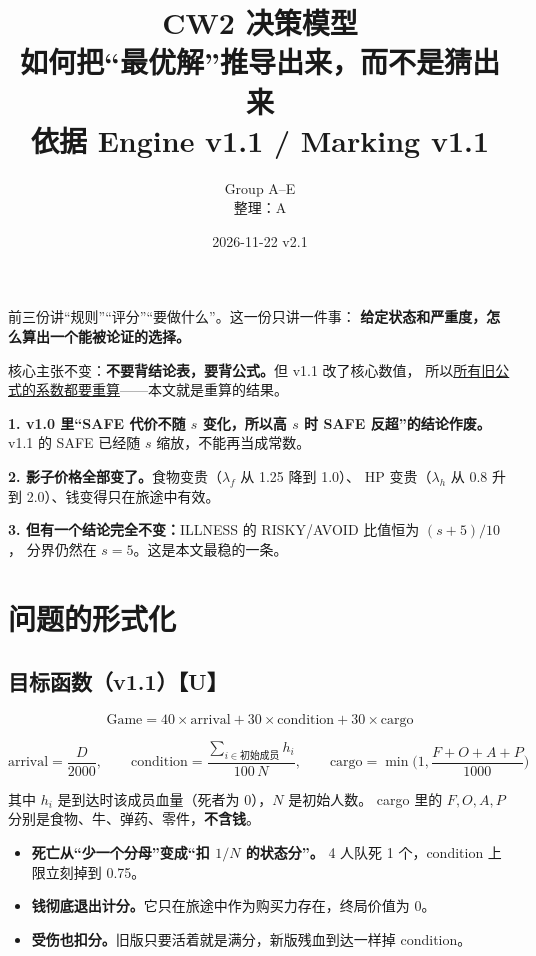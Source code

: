 \documentclass[UTF8,11pt,a4paper]{ctexart}
\title{\vspace{-1.2cm}\textbf{CW2 决策模型}\\[4pt]
\large 如何把“最优解”推导出来，而不是猜出来\\[2pt]
\normalsize 依据 Engine v1.1 / Marking v1.1}
\author{Group A--E\\\small 整理：A}
\date{2026-11-22 \quad v2.1}
\begin{document}
\maketitle
\thispagestyle{fancy}

\begin{keybox}[title={这份文档要解决什么}]
前三份讲“规则”“评分”“要做什么”。这一份只讲一件事：
\textbf{给定状态和严重度，怎么算出一个能被论证的选择。}

核心主张不变：\textbf{不要背结论表，要背公式。}但 v1.1 改了核心数值，
所以\underline{所有旧公式的系数都要重算}——本文就是重算的结果。
\end{keybox}

\begin{warnbox}[title={相对 v1.0 文档的三处更正}]
\textbf{1. v1.0 里“SAFE 代价不随 $s$ 变化，所以高 $s$ 时 SAFE 反超”的结论作废。}
v1.1 的 SAFE 已经随 $s$ 缩放，不能再当成常数。

\textbf{2. 影子价格全部变了。}食物变贵（$\lambda_f$ 从 1.25 降到 1.0）、
HP 变贵（$\lambda_h$ 从 0.8 升到 2.0）、钱变得只在旅途中有效。

\textbf{3. 但有一个结论完全不变：}ILLNESS 的 RISKY/AVOID 比值恒为 $(s+5)/10$，
分界仍然在 $s=5$。这是本文最稳的一条。
\end{warnbox}

\section{问题的形式化}

\subsection{目标函数（v1.1）【U】}

\[
\text{Game} = 40\times\text{arrival} + 30\times\text{condition} + 30\times\text{cargo}
\]

\[
\text{arrival}=\frac{D}{2000},\qquad
\text{condition}=\frac{\sum_{i\in\text{初始成员}} h_i}{100\,N},\qquad
\text{cargo}=\min\!\Big(1,\frac{F+O+A+P}{1000}\Big)
\]

其中 $h_i$ 是到达时该成员血量（死者为 0），$N$ 是初始人数。
cargo 里的 $F,O,A,P$ 分别是食物、牛、弹药、零件，\textbf{不含钱}。

\begin{keybox}[title={三个结构性变化}]
\begin{itemize}[leftmargin=1.4em]
  \item \textbf{死亡从“少一个分母”变成“扣 $1/N$ 的状态分”。}
        4 人队死 1 个，condition 上限立刻掉到 0.75。
  \item \textbf{钱彻底退出计分。}它只在旅途中作为购买力存在，终局价值为 0。
  \item \textbf{受伤也扣分。}旧版只要活着就是满分，新版残血到达一样掉 condition。
\end{itemize}
\end{keybox}
\end{document}

